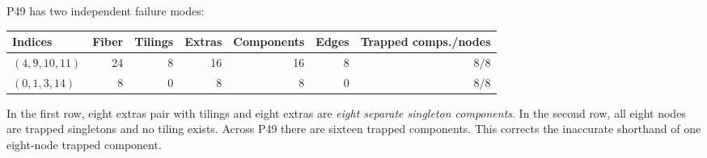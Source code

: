 P49 has two independent failure modes:

\begin{center}
\small
\begin{tabular}{@{}lrrrrrr@{}}
\toprule
Indices & Fiber & Tilings & Extras & Components & Edges
& Trapped comps./nodes\\
\midrule
\((4,9,10,11)\) & 24 & 8 & 16 & 16 & 8 & \(8/8\)\\
\((0,1,3,14)\) & 8 & 0 & 8 & 8 & 0 & \(8/8\)\\
\bottomrule
\end{tabular}
\end{center}

In the first row, eight extras pair with tilings and eight extras are
\emph{eight separate singleton components}.  In the second row, all eight
nodes are trapped singletons and no tiling exists.  Across P49 there are
sixteen trapped components.  This corrects the inaccurate shorthand of one
eight-node trapped component.
